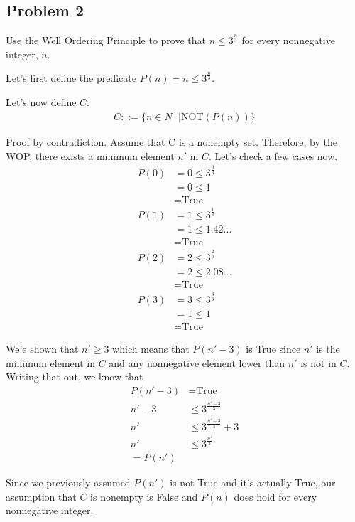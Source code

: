 \documentclass[12pt]{article}
\begin{document}
\subsection*{Problem 2}
\par{Use the Well Ordering Principle to prove that $n \leq 3^{\frac{n}{3}}$ for every nonnegative integer, $n$.}
\newline
\par{Let's first define the predicate $P(n) = n \leq 3^{\frac{n}{3}}$.}
\par{Let's now define $C$.}
\begin{align*}
C ::= \{n \in N^+ | \text{NOT}(P(n))\}
\end{align*}
\par{Proof by contradiction. Assume that C is a nonempty set. Therefore, by the WOP, there exists a minimum element $n'$ in $C$. Let's check a few cases now.}
\begin{align*}
P(0) &= 0 \leq 3^{\frac{0}{3}} \\
&= 0 \leq 1 \\
&= \text{True} \\
P(1) &= 1 \leq 3^{\frac{1}{3}} \\
&= 1 \leq 1.42... \\
&= \text{True} \\
P(2) &= 2 \leq 3^{\frac{2}{3}} \\
&= 2 \leq 2.08... \\
&= \text{True} \\
P(3) &= 3 \leq 3^{\frac{3}{3}} \\
&= 1 \leq 1 \\
&= \text{True}
\end{align*}
\par{We'e shown that $n' \geq 3$ which means that $P(n' - 3)$ is True since $n'$ is the minimum element in $C$ and any nonnegative element lower than $n'$ is not in $C$. Writing that out, we know that}
\begin{align*}
P(n' - 3) &= \text{True} \\
n' - 3 &\leq 3^{\frac{n' - 3}{3}} \\
n' &\leq 3^{\frac{n' - 3}{3}} + 3 \\
n' &\leq 3^{\frac{n'}{3}} \\
= P(n')
\end{align*}
\par{Since we previously assumed $P(n')$ is not True and it's actually True, our assumption that $C$ is nonempty is False and $P(n)$ does hold for every nonnegative integer.}
\end{document}

